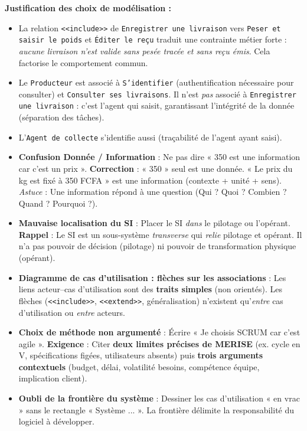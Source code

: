 \documentclass[11pt]{article}
\newcommand{\cle}[1]{{\popxbold\color{popdark}#1}}
\newcounter{popsec}
\newcounter{popsub}
\newcommand{\courssub}[1]{%
  \stepcounter{popsub}%
  \par\vspace{9pt}\noindent{\popxbold\fontsize{11.5}{13}\selectfont\color{popink}{\color{poporange}\thepopsec.\thepopsub}\hspace{6pt}#1}\par\nopagebreak\vspace{4pt}
}
\begin{document}
\begin{exoresolu}
\textbf{Justification des choix de modélisation :}
\begin{itemize}
\item La relation \texttt{<<include>>} de \texttt{Enregistrer une livraison} vers \texttt{Peser et saisir le poids} et \texttt{Éditer le reçu} traduit une contrainte métier forte : \emph{aucune livraison n'est valide sans pesée tracée et sans reçu émis}. Cela factorise le comportement commun.
\item Le \texttt{Producteur} est associé à \texttt{S'identifier} (authentification nécessaire pour consulter) et \texttt{Consulter ses livraisons}. Il n'est \emph{pas} associé à \texttt{Enregistrer une livraison} : c'est l'agent qui saisit, garantissant l'intégrité de la donnée (séparation des tâches).
\item L'\texttt{Agent de collecte} s'identifie aussi (traçabilité de l'agent ayant saisi).
\end{itemize}
\end{exoresolu}

\courssub{Erreurs fréquentes à éviter}

\begin{attention}
\begin{itemize}
\item \textbf{Confusion Donnée / Information} : Ne pas dire « 350 est une information car c'est un prix ». \textbf{Correction} : « 350 » seul est une \cle{donnée}. « Le prix du kg est fixé à 350 FCFA » est une \cle{information} (contexte + unité + sens). \textit{Astuce} : Une information répond à une question (Qui ? Quoi ? Combien ? Quand ? Pourquoi ?).
\item \textbf{Mauvaise localisation du SI} : Placer le SI \emph{dans} le pilotage ou l'opérant. \textbf{Rappel} : Le SI est un sous-système \emph{transverse} qui \emph{relie} pilotage et opérant. Il n'a pas pouvoir de décision (pilotage) ni pouvoir de transformation physique (opérant).
\item \textbf{Diagramme de cas d'utilisation : flèches sur les associations} : Les liens acteur--cas d'utilisation sont des \textbf{traits simples} (non orientés). Les flèches (\texttt{<<include>>}, \texttt{<<extend>>}, généralisation) n'existent qu'\emph{entre} cas d'utilisation ou \emph{entre} acteurs.
\item \textbf{Choix de méthode non argumenté} : Écrire « Je choisis SCRUM car c'est agile ». \textbf{Exigence} : Citer \textbf{deux limites précises de MERISE} (ex. cycle en V, spécifications figées, utilisateurs absents) puis \textbf{trois arguments contextuels} (budget, délai, volatilité besoins, compétence équipe, implication client).
\item \textbf{Oubli de la frontière du système} : Dessiner les cas d'utilisation « en vrac » sans le rectangle « Système ... ». La frontière délimite la responsabilité du logiciel à développer.
\end{itemize}
\end{attention}
\end{document}

